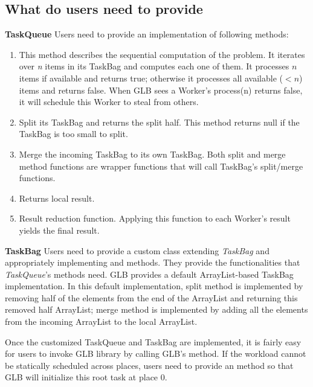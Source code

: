 \subsection{What do users need to provide}
\label{sec:design:user}
\textbf{TaskQueue} Users need to provide an implementation of following methods:
\begin{enumerate}
\item {} This method describes the sequential computation of the problem. It iterates over \textit{n} items in its TaskBag and computes each one of them. It processes $n$ items if available and returns true; otherwise it processes all available ($<n$) items and returns false. When GLB sees a Worker's process(n) returns false, it will schedule this Worker to steal from others.
 \item {} Split its TaskBag and returns the split half. This method returns null if the TaskBag is too small to split.  
\item {} Merge the incoming TaskBag to its own TaskBag.
Both split and merge method functions are wrapper functions that will call TaskBag's split/merge functions. 
\item {} Returns local result.
\item {} Result reduction function. Applying this function to each Worker's result yields the final result.
\end{enumerate}
\textbf{TaskBag} Users need to provide a custom class extending \textit{TaskBag} and appropriately implementing  and  methods. They provide the functionalities that \textit{TaskQueue}'s  methods need. GLB provides a default ArrayList-based TaskBag implementation. In this default implementation, split method is implemented by removing half of the elements from the end of the ArrayList and returning this removed half ArrayList; merge method is implemented by adding all the elements from the incoming ArrayList to the local ArrayList.  


Once the customized TaskQueue and TaskBag are implemented, it is fairly easy for
users to invoke GLB library by calling GLB's  method. If the workload cannot be statically scheduled across places, users need to provide an  method so that GLB will initialize this root task at place 0.  

